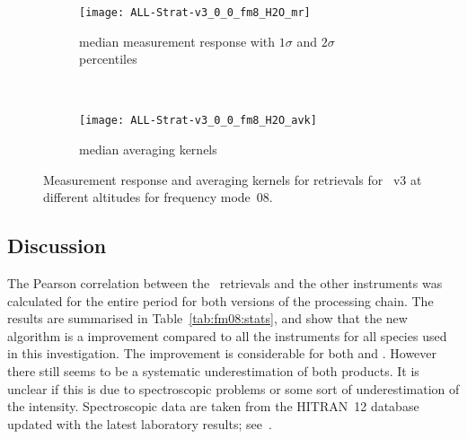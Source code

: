 \begin{figure}[tbhp]
    \centering
    \begin{subfigure}[b]{0.49\textwidth}
        \texttt{[image: ALL-Strat-v3\_0\_0\_fm8\_H2O\_mr]}
        \caption{median measurement response with $1\sigma$ and $2\sigma$
        percentiles}
        \label{fig:fm08:H2O:mr}
    \end{subfigure}
    \,
    \begin{subfigure}[b]{0.49\textwidth}
        \texttt{[image: ALL-Strat-v3\_0\_0\_fm8\_H2O\_avk]}
        \caption{median averaging kernels\newline~}
        \label{fig:fm08:H2O:avk}
    \end{subfigure}
    \caption{Measurement response and averaging kernels for 
    retrievals for \smr~v3 at different altitudes for frequency mode~08.}
    \label{fig:fm08:H2O:mr_avk}
\end{figure}

\newpage
\subsection{Discussion}
\label{sec:fm08:discussion}
The Pearson correlation between the \smr\ retrievals and the other instruments
was calculated for the entire period for both versions of the processing chain.
The results are summarised in Table~\ref{tab:fm08:stats}, and show that the
new algorithm is a improvement compared to all the instruments for all species
used in this investigation. The improvement is considerable for both 
and . However there still seems to be a systematic underestimation
of both products. It is unclear if this is due to spectroscopic problems or
some sort of underestimation of the intensity.  Spectroscopic data are taken
from the HITRAN~12 database updated with the latest laboratory results;
see~\cite{atbdl2}.


